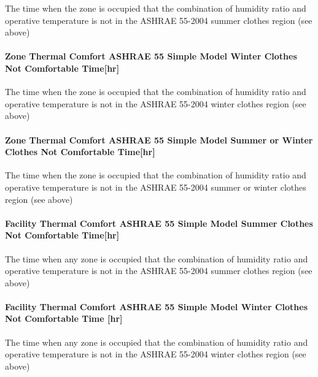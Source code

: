 The time when the zone is occupied that the combination of humidity ratio and operative temperature is not in the ASHRAE 55-2004 summer clothes region (see above)

\paragraph{Zone Thermal Comfort ASHRAE 55 Simple Model Winter Clothes Not Comfortable Time{[}hr{]}}\label{zone-thermal-comfort-ashrae-55-simple-model-winter-clothes-not-comfortable-timehr}

The time when the zone is occupied that the combination of humidity ratio and operative temperature is not in the ASHRAE 55-2004 winter clothes region (see above)

\paragraph{Zone Thermal Comfort ASHRAE 55 Simple Model Summer or Winter Clothes Not Comfortable Time{[}hr{]}}\label{zone-thermal-comfort-ashrae-55-simple-model-summer-or-winter-clothes-not-comfortable-timehr}

The time when the zone is occupied that the combination of humidity ratio and operative temperature is not in the ASHRAE 55-2004 summer or winter clothes region (see above)

\paragraph{Facility Thermal Comfort ASHRAE 55 Simple Model Summer Clothes Not Comfortable Time{[}hr{]}}\label{facility-thermal-comfort-ashrae-55-simple-model-summer-clothes-not-comfortable-timehr}

The time when any zone is occupied that the combination of humidity ratio and operative temperature is not in the ASHRAE 55-2004 summer clothes region (see above)

\paragraph{Facility Thermal Comfort ASHRAE 55 Simple Model Winter Clothes Not Comfortable Time {[}hr{]}}\label{facility-thermal-comfort-ashrae-55-simple-model-winter-clothes-not-comfortable-time-hr}

The time when any zone is occupied that the combination of humidity ratio and operative temperature is not in the ASHRAE 55-2004 winter clothes region (see above)

